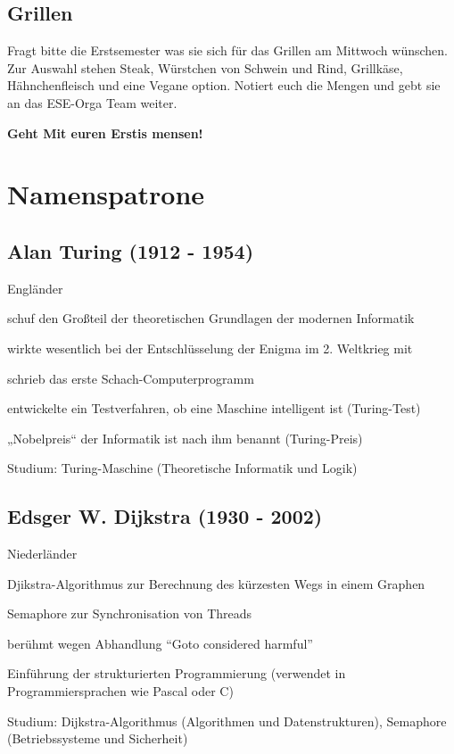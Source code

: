 \documentclass[a4paper,12pt]{report}
\begin{document}
\section{Grillen}

Fragt bitte die Erstsemester was sie sich für das Grillen am Mittwoch wünschen. Zur Auswahl stehen Steak, Würstchen von Schwein und Rind, Grillkäse, Hähnchenfleisch und eine Vegane option. Notiert euch die Mengen und gebt sie an das ESE-Orga Team weiter.

\bigskip
\bigskip
\begin{center}
\huge{\textbf{Geht Mit euren Erstis mensen!}}
\end{center}
\chapter{Namenspatrone}
\section*{Alan Turing (1912 - 1954)}
\begin{itemize*}
    \item Engländer
    \item schuf den Großteil der theoretischen Grundlagen der modernen Informatik
    \item wirkte wesentlich bei der Entschlüsselung der Enigma im 2. Weltkrieg mit
    \item schrieb das erste Schach-Computerprogramm
    \item entwickelte ein Testverfahren, ob eine Maschine intelligent ist (Turing-Test)
    \item „Nobelpreis“ der Informatik ist nach ihm benannt (Turing-Preis)
    \item Studium: Turing-Maschine (Theoretische Informatik und Logik)
\end{itemize*}

\section*{Edsger W. Dijkstra (1930 - 2002)}
\begin{itemize*}
    \item Niederländer
    \item Djikstra-Algorithmus zur Berechnung des kürzesten Wegs in einem Graphen
    \item Semaphore zur Synchronisation von Threads
    \item berühmt wegen Abhandlung ``Goto considered harmful''
    \item Einführung der strukturierten Programmierung (verwendet in Programmiersprachen wie
          Pascal oder C)
    \item Studium: Dijkstra-Algorithmus (Algorithmen und Datenstrukturen), Semaphore
          (Betriebssysteme und Sicherheit)
\end{itemize*}
\end{document}
